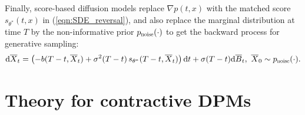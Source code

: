 \documentclass[letterpaper,10pt,reqno]{amsart}
\def\eqref#1{(\ref{#1})}
\numberwithin{equation}{section}
\begin{document}
Finally, score-based diffusion models \cite{Song20} replace $\nabla p(t,x)$ with the matched score $s_{\theta^{*}}(t,x)$ in \eqref{eqn:SDE_reversal}, and also replace the marginal distribution at time $T$ by the non-informative prior $p_{\scalebox{0.7}{noise}}(\cdot)$ to get the backward process for generative sampling:
\begin{equation}
\label{eq:SDErevc}
\mathrm{d}\overline{X}_t = \left(-b(T-t, \overline{X}_t) + \sigma^2(T-t) \, s_{\theta^{*}}(T-t, \overline{X}_t) \right)\mathrm{d}t + \sigma(T-t) \mathrm{d}\overline{B}_t,
\,\, \overline{X}_0 \sim p_{\scalebox{0.7}{noise}}(\cdot).
\end{equation}


\section{Theory for contractive DPMs}
\label{sc3}
\end{document}
